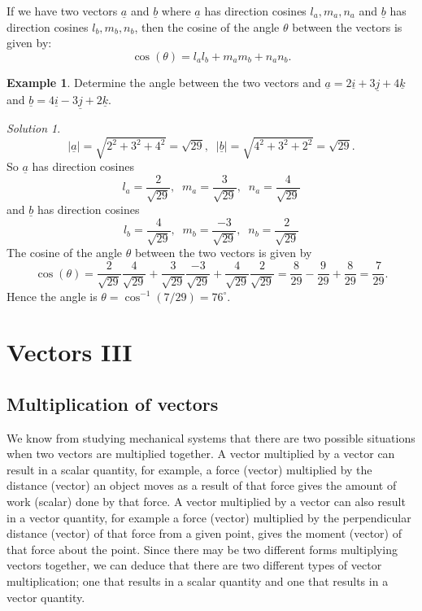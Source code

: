 \documentclass[
  11pt,
  oneside]{book}
\newcommand{\slide}{}
\theoremstyle{definition}
\theoremstyle{definition}
\newtheorem{example}{Example}[chapter]
\theoremstyle{definition}
\theoremstyle{definition}
\theoremstyle{remark}
\newtheorem*{solution}{Solution}
\begin{document}
If we have two vectors \(\underline a\) and \(\underline b\) where \(\underline a\) has direction cosines \(l_a, m_a, n_a\) and \(\underline b\) has direction cosines \(l_b, m_b, n_b\), then the cosine of the angle \(\theta\) between the vectors is given by:
\[
\cos(\theta) = l_al_b + m_am_b + n_an_b.
\]
\slide

\begin{example}
Determine the angle between the two vectors and \(\underline a = 2\underline i + 3\underline j + 4\underline k\) and \(\underline b = 4\underline i - 3\underline j + 2\underline k\).
\end{example}

\begin{solution}
\[
|\underline a| = \sqrt{2^2+3^2+4^2} = \sqrt{29},\;\;|\underline b| = \sqrt{4^2+3^2+2^2} = \sqrt{29}.
\]
So \(\underline a\) has direction cosines
\[
l_a = \frac{2}{\sqrt{29}},\;\;m_a = \frac{3}{\sqrt{29}},\;\;n_a = \frac{4}{\sqrt{29}}
\]
and \(\underline b\) has direction cosines
\[
l_b = \frac{4}{\sqrt{29}},\;\;m_b = \frac{-3}{\sqrt{29}},\;\;n_b = \frac{2}{\sqrt{29}}
\]
The cosine of the angle \(\theta\) between the two vectors is given by
\[
\cos(\theta) = \frac{2}{\sqrt{29}}\frac{4}{\sqrt{29}}+\frac{3}{\sqrt{29}}\frac{-3}{\sqrt{29}}+\frac{4}{\sqrt{29}}\frac{2}{\sqrt{29}} = \frac{8}{29}-\frac{9}{29}+\frac{8}{29} = \frac{7}{29}.
\]
Hence the angle is \(\theta = \cos^{-1}(7/29) = 76^\circ\).
\end{solution}

\slide

\section{Vectors III}\label{vectors-iii}

\subsection{Multiplication of vectors}\label{multiplication-of-vectors}

We know from studying mechanical systems that there are two possible situations when two vectors are multiplied together. A vector multiplied by a vector can result in a scalar quantity, for example, a force (vector) multiplied by the distance (vector) an object moves as a result of that force gives the amount of work (scalar) done by that force. A vector multiplied by a vector can also result in a vector quantity, for example a force (vector) multiplied by the perpendicular distance (vector) of that force from a given point, gives the moment (vector) of that force about the point. Since there may be two different forms multiplying vectors together, we can deduce that there are two different types of vector multiplication; one that results in a scalar quantity and one that results in a vector quantity.
\end{document}
